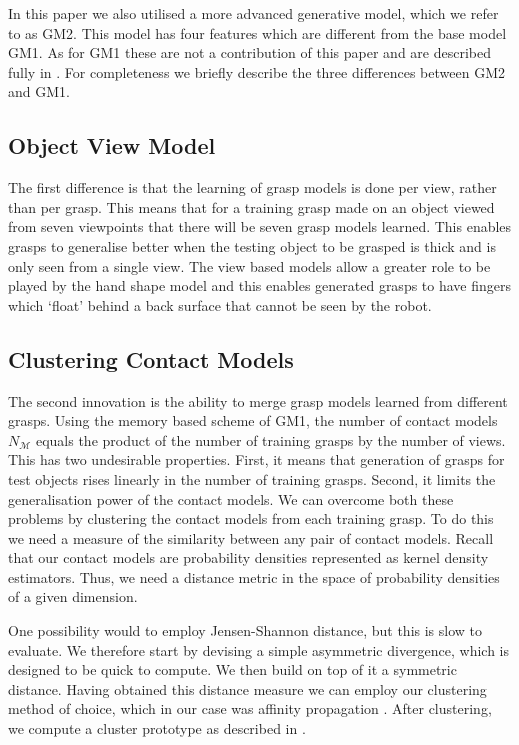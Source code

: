 
In this paper we also utilised a more advanced generative model, which we refer to as GM2. This model has four features which are different from the base model GM1. As for GM1 these are not a contribution of this paper and are described fully in \cite{kopicki2019ijrr}. For completeness we briefly describe the three differences between GM2 and GM1. 

\subsection{Object View Model}\label{sec:representations.object}
The first difference is that the learning of grasp models is done per view, rather than per grasp. This means that for a training grasp made on an object viewed from seven viewpoints that there will be seven grasp models learned. This enables grasps to generalise better when the testing object to be grasped is thick and is only seen from a single view. The view based models allow a greater role to be played by the hand shape model and this enables generated grasps to have fingers which `float' behind a back surface that cannot be seen by the robot.

\subsection{Clustering Contact Models}\label{sec:learning.clustering}

The second innovation is the ability to merge grasp models learned from different grasps. Using the memory based scheme of GM1, the number of contact models $N_{\mathcal{M}}$ equals the product of the number of training grasps by the number of views. This has two undesirable properties. First, it means that generation of grasps for test objects rises linearly in the number of training grasps. Second, it limits the generalisation power of the contact models. We can overcome both these problems by clustering the contact models from each training grasp. To do this we need a measure of the similarity between any pair of contact models. Recall that our contact models are probability densities represented as kernel density estimators. Thus, we need a distance metric in the space of probability densities of a given dimension.

One possibility would to employ Jensen-Shannon distance, but this is slow to evaluate. We therefore start by devising a simple asymmetric divergence, which is designed to be quick to compute. We then build on top of it a symmetric distance. Having obtained this distance measure we can employ our clustering method of choice, which in our case was affinity propagation \cite{frey2007clustering}. After clustering, we compute a cluster prototype as described in \cite{kopicki2019}.


